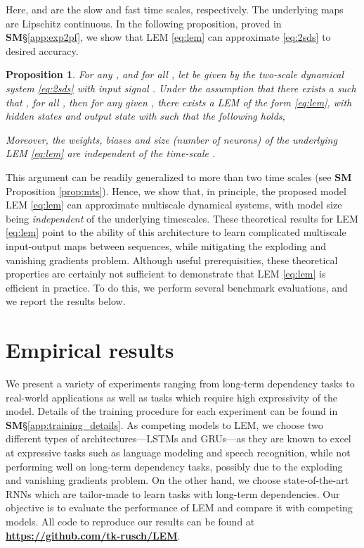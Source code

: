 \documentclass{article} \usepackage{iclr2022_conference,times}
\newtheorem{proposition}[theorem]{Proposition}
\begin{document}
Here,  and  are the slow and fast time scales, respectively. The underlying maps  are Lipschitz continuous. In the following proposition, proved in {\bf SM}\S\ref{app:exp2pf}, we show that LEM \eqref{eq:lem} can approximate \eqref{eq:2sds} to desired accuracy. 
\begin{proposition}
\label{prop:exp2}
For any , and for all , let  be given by the two-scale dynamical system \eqref{eq:2sds} with input signal . Under the assumption that there exists a  such that , for all , then for any given , there exists a LEM of the form \eqref{eq:lem}, with hidden states  and output state  with  such that 
the following holds,

Moreover, the weights, biases and size (number of neurons) of the underlying LEM \eqref{eq:lem} are \emph{independent} of the time-scale .
\end{proposition}
This argument can be readily generalized to more than two time scales (see {\bf SM} Proposition \ref{prop:mts}). Hence, we show that, in principle, the proposed model LEM \eqref{eq:lem} can approximate multiscale dynamical systems, with model size being \emph{independent} of the underlying timescales. These theoretical results for LEM \eqref{eq:lem} point to the ability of this architecture to learn complicated multiscale input-output maps between sequences, while mitigating the exploding and vanishing gradients problem. Although useful prerequisities, these theoretical properties are certainly not sufficient to demonstrate that LEM \eqref{eq:lem} is efficient in practice. To do this, we perform several benchmark evaluations, and we report the results below. 
\section{Empirical results}
\label{sxn:empirical}

We present a variety of experiments ranging from long-term dependency tasks to real-world applications as well as tasks which require high expressivity of the model.  
Details of the training procedure for each experiment can be found in {\bf SM}\S\ref{app:training_details}. 
As competing models to LEM, we choose two different types of architectures---LSTMs and GRUs---as they are known to excel at expressive tasks such as language modeling and speech recognition, while not performing well on long-term dependency tasks, possibly due to the exploding and vanishing gradients problem.  
On the other hand, we choose state-of-the-art RNNs which are tailor-made to learn tasks with long-term dependencies. Our objective is to evaluate the performance of LEM and compare it with competing models.
All code to reproduce our results can be found at \href{https://github.com/tk-rusch/LEM}{\textbf{https://github.com/tk-rusch/LEM}}.
\end{document}

